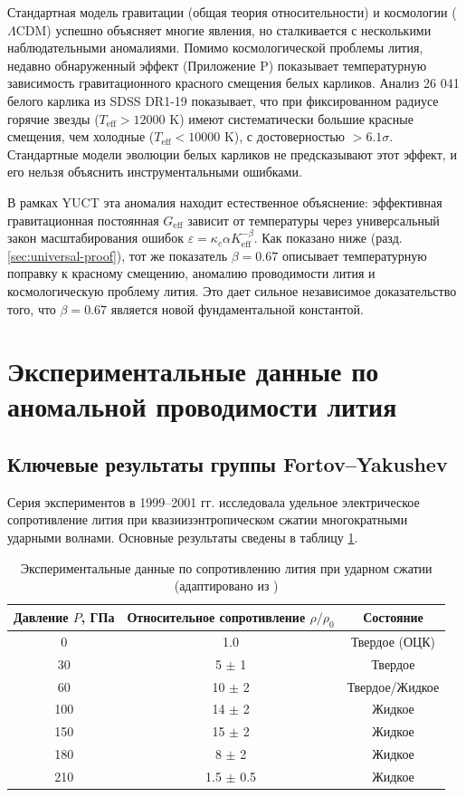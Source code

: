 \documentclass[12pt,a4paper]{article}
\theoremstyle{remark}
\newcommand{\Ke}{K_{\mathrm{eff}}}
\newcommand{\kappac}{\kappa_c}
\newcommand{\alp}{\alpha}
\begin{document}
	Стандартная модель гравитации (общая теория относительности) и космологии (\(\Lambda\)CDM) успешно объясняет многие явления, но сталкивается с несколькими наблюдательными аномалиями. Помимо космологической проблемы лития, недавно обнаруженный эффект (Приложение P) показывает температурную зависимость гравитационного красного смещения белых карликов. Анализ 26 041 белого карлика из SDSS DR1-19 \cite{Crumpler2024} показывает, что при фиксированном радиусе горячие звезды (\(T_{\mathrm{eff}} > 12000\) K) имеют систематически большие красные смещения, чем холодные (\(T_{\mathrm{eff}} < 10000\) K), с достоверностью \(>6.1\sigma\). Стандартные модели эволюции белых карликов не предсказывают этот эффект, и его нельзя объяснить инструментальными ошибками.
	
	В рамках YUCT эта аномалия находит естественное объяснение: эффективная гравитационная постоянная \(G_{\mathrm{eff}}\) зависит от температуры через универсальный закон масштабирования ошибок \(\varepsilon = \kappac \alp \Ke^{-\beta}\). Как показано ниже (разд. \ref{sec:universal-proof}), тот же показатель \(\beta = 0.67\) описывает температурную поправку к красному смещению, аномалию проводимости лития и космологическую проблему лития. Это дает сильное независимое доказательство того, что \(\beta = 0.67\) является новой фундаментальной константой.
	
	\section{Экспериментальные данные по аномальной проводимости лития}
	
	\subsection{Ключевые результаты группы Fortov–Yakushev}
	
	Серия экспериментов в 1999–2001 гг. \cite{fortov1999, fortov2001, yakushev2002} исследовала удельное электрическое сопротивление лития при квазиизэнтропическом сжатии многократными ударными волнами. Основные результаты сведены в таблицу \ref{tab:exp_data}.
	
	\begin{table}[h]
		\centering
		\caption{Экспериментальные данные по сопротивлению лития при ударном сжатии (адаптировано из \cite{fortov2001, yakushev2002})}
		\label{tab:exp_data}
		\begin{tabular}{ccc}
			\toprule
			Давление \(P\), ГПа & Относительное сопротивление \(\rho/\rho_0\) & Состояние \\
			\midrule
			0 & 1.0 & Твердое (ОЦК) \\
			30 & 5 \(\pm\) 1 & Твердое \\
			60 & 10 \(\pm\) 2 & Твердое/Жидкое \\
			100 & 14 \(\pm\) 2 & Жидкое \\
			150 & 15 \(\pm\) 2 & Жидкое \\
			180 & 8 \(\pm\) 2 & Жидкое \\
			210 & 1.5 \(\pm\) 0.5 & Жидкое \\
			\bottomrule
		\end{tabular}
	\end{table}
	
\end{document}
